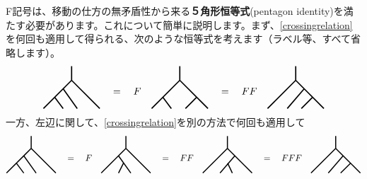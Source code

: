 \documentclass[report,paper=a4, fontsize=12pt, line_length=16cm, number_of_lines=33,dvipdfmx]{jlreq}
\newcommand{\kyou}[1]{{\sffamily \bfseries #1}}
\numberwithin{equation}{chapter}
\begin{document}
F記号は、移動の仕方の無矛盾性から来る\kyou{５角形恒等式}(pentagon identity)を満たす必要があります。これについて簡単に説明します。まず、\eqref{crossingrelation}を何回も適用して得られる、次のような恒等式を考えます（ラベル等、すべて省略します）。
\begin{align}
  \begin{tikzpicture}[baseline=0]
      \draw[very thick](0.5,0.5)--(-0.5,-0.5);
      \draw[very thick](-0.1, -0.1)--(0.2,-0.5);
      \draw[very thick](0.2, 0.2)--(0.7,-0.5);
      \draw[very thick](0.5,0.5)--(1.5,-0.5);
      \draw[very thick](0.5,0.5)--(0.5,1);
  \end{tikzpicture}
  \quad = \quad
  F
  \quad
  \begin{tikzpicture}[baseline=0]
      \draw[very thick](0.5,0.5)--(-0.5,-0.5);
      \draw[very thick](-0.1, -0.1)--(0.2,-0.5);
      \draw[very thick](1.1, -0.1)--(0.7,-0.5);
      \draw[very thick](0.5,0.5)--(1.5,-0.5);
      \draw[very thick](0.5,0.5)--(0.5,1);
  \end{tikzpicture}
  \quad = \quad
  FF\quad
  \begin{tikzpicture}[baseline=0]
      \draw[very thick](0.5,0.5)--(-0.5,-0.5);
      \draw[very thick](0.8, 0.2)--(0.2,-0.5);
      \draw[very thick](1.1, -0.1)--(0.7,-0.5);
      \draw[very thick](0.5,0.5)--(1.5,-0.5);
      \draw[very thick](0.5,0.5)--(0.5,1);
  \end{tikzpicture}
  \label{temppentagon1}
\end{align}
一方、左辺に関して、\eqref{crossingrelation}を別の方法で何回も適用して
\begin{align}
  \begin{tikzpicture}[baseline=0]
      \draw[very thick](0.5,0.5)--(-0.5,-0.5);
      \draw[very thick](-0.1, -0.1)--(0.2,-0.5);
      \draw[very thick](0.2, 0.2)--(0.7,-0.5);
      \draw[very thick](0.5,0.5)--(1.5,-0.5);
      \draw[very thick](0.5,0.5)--(0.5,1);
  \end{tikzpicture}
  \quad = \quad
  F
  \quad
  \begin{tikzpicture}[baseline=0]
      \draw[very thick](0.5,0.5)--(-0.5,-0.5);
      \draw[very thick](0.4, -0.1)--(0.2,-0.5);
      \draw[very thick](0.2, 0.2)--(0.7,-0.5);
      \draw[very thick](0.5,0.5)--(1.5,-0.5);
      \draw[very thick](0.5,0.5)--(0.5,1);
  \end{tikzpicture}
  \quad = \quad
  FF\quad
  \begin{tikzpicture}[baseline=0]
      \draw[very thick](0.5,0.5)--(-0.5,-0.5);
      \draw[very thick](0.8, 0.2)--(0.2,-0.5);
      \draw[very thick](0.51, -0.1)--(0.7,-0.5);
      \draw[very thick](0.5,0.5)--(1.5,-0.5);
      \draw[very thick](0.5,0.5)--(0.5,1);
  \end{tikzpicture}
  \quad = \quad
  FFF\quad
  \begin{tikzpicture}[baseline=0]
      \draw[very thick](0.5,0.5)--(-0.5,-0.5);
      \draw[very thick](0.8, 0.2)--(0.2,-0.5);
      \draw[very thick](1.1, -0.1)--(0.7,-0.5);
      \draw[very thick](0.5,0.5)--(1.5,-0.5);
      \draw[very thick](0.5,0.5)--(0.5,1);
  \end{tikzpicture}
  \label{temppentagon2}
\end{align}
\end{document}
